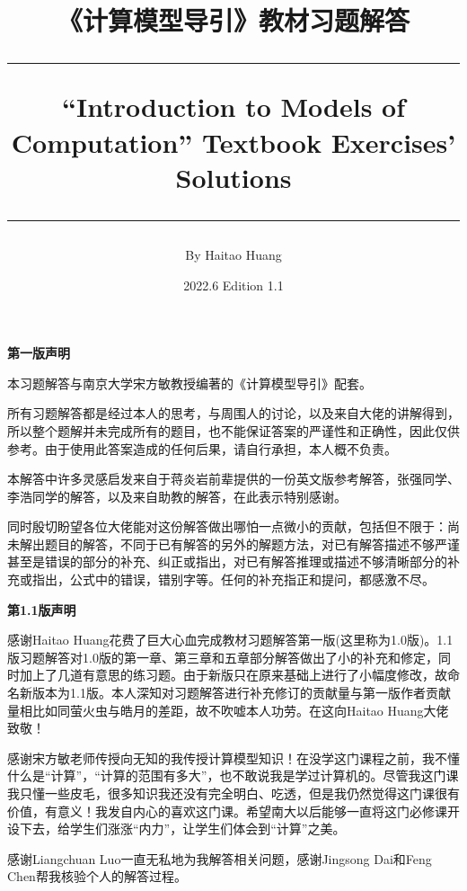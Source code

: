 \documentclass[a4paper,twoside]{article}
\title{ 
  \bf \huge 《计算模型导引》教材习题解答 
  \rule{0.9 \textwidth}{1pt}
  \bf \LARGE “Introduction to Models of Computation” Textbook Exercises' Solutions
  \rule{0.9 \textwidth}{1pt}  
}
\author{By Haitao Huang}
\date{2022.6 Edition 1.1}
\begin{document}
\begin{titlepage}

\maketitle
\thispagestyle{empty}
\end{titlepage}

\begin{center}
\bf\LARGE 第一版声明
\end{center}

本习题解答与南京大学宋方敏教授编著的《计算模型导引》配套。

所有习题解答都是经过本人的思考，与周围人的讨论，以及来自大佬的讲解得到，所以整个题解并未完成所有的题目，也不能保证答案的严谨性和正确性，因此仅供参考。由于使用此答案造成的任何后果，请自行承担，本人概不负责。

本解答中许多灵感启发来自于蒋炎岩前辈提供的一份英文版参考解答，张强同学、李浩同学的解答，以及来自助教的解答，在此表示特别感谢。

同时殷切盼望各位大佬能对这份解答做出哪怕一点微小的贡献，包括但不限于：尚未解出题目的解答，不同于已有解答的另外的解题方法，对已有解答描述不够严谨甚至是错误的部分的补充、纠正或指出，对已有解答推理或描述不够清晰部分的补充或指出，公式中的错误，错别字等。任何的补充指正和提问，都感激不尽。



\begin{center}
\bf\LARGE 第1.1版声明
\end{center}

感谢Haitao Huang花费了巨大心血完成教材习题解答第一版(这里称为1.0版)。1.1版习题解答对1.0版的第一章、第三章和五章部分解答做出了小的补充和修定，同时加上了几道有意思的练习题。由于新版只在原来基础上进行了小幅度修改，故命名新版本为1.1版。本人深知对习题解答进行补充修订的贡献量与第一版作者贡献量相比如同萤火虫与皓月的差距，故不吹嘘本人功劳。在这向Haitao Huang大佬致敬！

感谢宋方敏老师传授向无知的我传授计算模型知识！在没学这门课程之前，我不懂什么是“计算”，“计算的范围有多大”，也不敢说我是学过计算机的。尽管我这门课我只懂一些皮毛，很多知识我还没有完全明白、吃透，但是我仍然觉得这门课很有价值，有意义！我发自内心的喜欢这门课。希望南大以后能够一直将这门必修课开设下去，给学生们涨涨“内力”，让学生们体会到“计算”之美。

感谢Liangchuan Luo一直无私地为我解答相关问题，感谢Jingsong Dai和Feng Chen帮我核验个人的解答过程。
\end{document}
